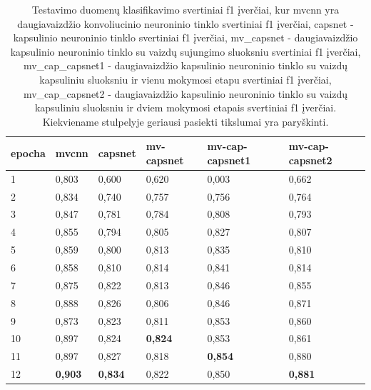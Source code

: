 \begin{table}[]
	\caption{
		Testavimo duomenų klasifikavimo svertiniai f1 įverčiai, kur mvcnn yra daugiavaizdžio konvoliucinio neuroninio tinklo svertiniai f1 įverčiai, capsnet - kapsulinio neuroninio tinklo svertiniai f1 įverčiai, mv\_capsnet - daugiavaizdžio kapsulinio neuroninio tinklo su vaizdų sujungimo sluoksniu svertiniai f1 įverčiai, mv\_cap\_capsnet1 - daugiavaizdžio kapsulinio neuroninio tinklo su vaizdų kapsuliniu sluoksniu ir vienu mokymosi etapu svertiniai f1 įverčiai, mv\_cap\_capsnet2 - daugiavaizdžio kapsulinio neuroninio tinklo su vaizdų kapsuliniu sluoksniu ir dviem mokymosi etapais svertiniai f1 įverčiai. Kiekviename stulpelyje geriausi pasiekti tikslumai yra paryškinti.
	}
	\begin{tabular}{l|l|l|l|l|l}
		epocha & mvcnn & capsnet & mv-capsnet & mv-cap-capsnet1 & mv-cap-capsnet2 \\
		\hline
		1 & 0,803 &   0,600 &      0,620 &           0,003 &           0,662 \\
		2 & 0,834 &   0,740 &      0,757 &           0,756 &           0,764 \\
		3 & 0,847 &   0,781 &      0,784 &           0,808 &           0,793 \\
		4 & 0,855 &   0,794 &      0,805 &           0,827 &           0,807 \\
		5 & 0,859 &   0,800 &      0,813 &           0,835 &           0,810 \\
		6 & 0,858 &   0,810 &      0,814 &           0,841 &           0,814 \\
		7 & 0,875 &   0,822 &      0,813 &           0,846 &           0,855 \\
		8 & 0,888 &   0,826 &      0,806 &           0,846 &           0,871 \\
		9 & 0,873 &   0,823 &      0,811 &           0,853 &           0,860 \\
		10 & 0,897 &   0,824 &      \textbf{0,824} &           0,853 &           0,861 \\
		11 & 0,897 &   0,827 &      0,818 &           \textbf{0,854} &           0,880 \\
		12 & \textbf{0,903} &  \textbf{ 0,834} &      0,822 &           0,850 &           \textbf{0,881} \\
	\end{tabular}
	\label{tbl:weighted_f1}
\end{table}

